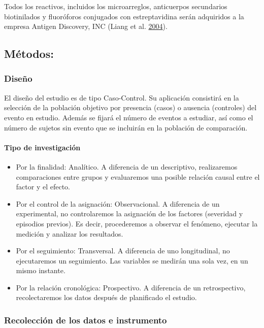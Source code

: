 \documentclass[
  a4paper]{article}
\let\oldparagraph\paragraph
\renewcommand{\paragraph}[1]{\oldparagraph{#1}\mbox{}}
\begin{document}
Todos los reactivos, incluidos los microarreglos, anticuerpos
secundarios biotinilados y fluoróforos conjugados con estreptavidina
serán adquiridos a la empresa Antigen Discovery, INC (Liang et al.
\protect\hyperlink{ref-adiinc}{2004}).

\hypertarget{muxe9todos}{%
\subsection{Métodos:}\label{muxe9todos}}

\hypertarget{diseuxf1o}{%
\subsubsection{Diseño}\label{diseuxf1o}}

El diseño del estudio es de tipo Caso-Control. Su aplicación consistirá
en la selección de la población objetivo por presencia (casos) o
ausencia (controles) del evento en estudio. Además se fijará el número
de eventos a estudiar, así como el número de sujetos sin evento que se
incluirán en la población de comparación.

\hypertarget{tipo-de-investigaciuxf3n}{%
\paragraph{Tipo de investigación}\label{tipo-de-investigaciuxf3n}}

\begin{itemize}
\item
  Por la finalidad: Analítico. A diferencia de un descriptivo,
  realizaremos comparaciones entre grupos y evaluaremos una posible
  relación causal entre el factor y el efecto.
\item
  Por el control de la asignación: Observacional. A diferencia de un
  experimental, no controlaremos la asignación de los factores
  (severidad y episodios previos). Es decir, procederemos a observar el
  fenómeno, ejecutar la medición y analizar los resultados.
\item
  Por el seguimiento: Transversal. A diferencia de uno longitudinal, no
  ejecutaremos un seguimiento. Las variables se medirán una sola vez, en
  un mismo instante.
\item
  Por la relación cronológica: Prospectivo. A diferencia de un
  retrospectivo, recolectaremos los datos después de planificado el
  estudio.
\end{itemize}

\hypertarget{recolecciuxf3n-de-los-datos-e-instrumento}{%
\subsubsection{Recolección de los datos e
instrumento}\label{recolecciuxf3n-de-los-datos-e-instrumento}}
\end{document}
